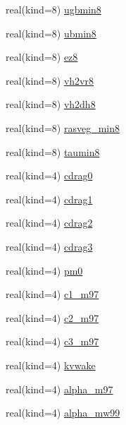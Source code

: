 \begin{DoxyCompactItemize}
\item 
real(kind=8) \hyperlink{namespacecanopy__air__coms_a96ad2cd68341db7649720ebd90eab97f}{ugbmin8}
\item 
real(kind=8) \hyperlink{namespacecanopy__air__coms_a436ed31f3d8eafc708115bca8ee30d03}{ubmin8}
\item 
real(kind=8) \hyperlink{namespacecanopy__air__coms_a7899b1f4a3a40f367c48fbaa9b7f2ccd}{ez8}
\item 
real(kind=8) \hyperlink{namespacecanopy__air__coms_a5425e68f350bd521634e2dec3df419cc}{vh2vr8}
\item 
real(kind=8) \hyperlink{namespacecanopy__air__coms_aee89a61c55f84edfb62d0b236dea93c8}{vh2dh8}
\item 
real(kind=8) \hyperlink{namespacecanopy__air__coms_a867a9672f31a44b6def8fc0bdf4eb440}{rasveg\+\_\+min8}
\item 
real(kind=8) \hyperlink{namespacecanopy__air__coms_a3cb44bad4430d800393ec76b7a22a782}{taumin8}
\item 
real(kind=4) \hyperlink{namespacecanopy__air__coms_a768765793f4c4b91a6ccca6d5263ad04}{cdrag0}
\item 
real(kind=4) \hyperlink{namespacecanopy__air__coms_a7b44abfd8d12fe84db70aab86954129c}{cdrag1}
\item 
real(kind=4) \hyperlink{namespacecanopy__air__coms_a1b94794c69c4e42537d77c51167c842f}{cdrag2}
\item 
real(kind=4) \hyperlink{namespacecanopy__air__coms_abaac76316a5a249db322fc990489d388}{cdrag3}
\item 
real(kind=4) \hyperlink{namespacecanopy__air__coms_a11e1c7b747cfb7033e3bf75fe4cdd0bc}{pm0}
\item 
real(kind=4) \hyperlink{namespacecanopy__air__coms_a1f414808e85114a30c83bdf9bbc35af6}{c1\+\_\+m97}
\item 
real(kind=4) \hyperlink{namespacecanopy__air__coms_a47dcf89394a1ea827c110b9ceb601b79}{c2\+\_\+m97}
\item 
real(kind=4) \hyperlink{namespacecanopy__air__coms_a40fc08a843524cc8b4e05ba8766cb930}{c3\+\_\+m97}
\item 
real(kind=4) \hyperlink{namespacecanopy__air__coms_a54402456387b824df174f09157236866}{kvwake}
\item 
real(kind=4) \hyperlink{namespacecanopy__air__coms_ac16bf823a6fc81f0d671fa06ca5de7e7}{alpha\+\_\+m97}
\item 
real(kind=4) \hyperlink{namespacecanopy__air__coms_aee71b7396b4019638189e8d16f29d5bc}{alpha\+\_\+mw99}
\item 

\end{DoxyCompactItemize}

